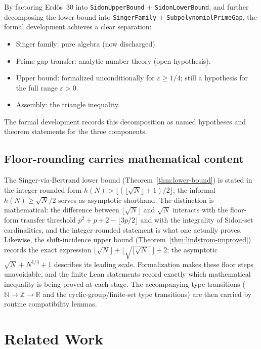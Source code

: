 \documentclass[11pt,a4paper]{article}
\begin{document}
By factoring Erd\H{o}s~30 into
\texttt{Sidon\-Upper\-Bound} $+$ \texttt{Sidon\-Lower\-Bound}, and further
decomposing the lower bound into \texttt{Singer\-Family} $+$
\texttt{Sub\-polynomial\-Prime\-Gap}, the formal development achieves a
clear separation:
\begin{itemize}[nosep]
  \item Singer family: pure algebra (now discharged).
  \item Prime gap transfer: analytic number theory (open hypothesis).
  \item Upper bound: formalized unconditionally for $\varepsilon\ge1/4$;
    still a hypothesis for the full range $\varepsilon>0$.
  \item Assembly: the triangle inequality.
\end{itemize}

The formal development records this decomposition as named hypotheses and
theorem statements for the three components.

\subsection{Floor-rounding carries mathematical content}

The Singer-via-Bertrand lower bound (Theorem~\ref{thm:lower-bound})
is stated in the integer-rounded form
$h(N) > \lfloor(\lfloor\sqrt{N}\rfloor+1)/2\rfloor$; the informal
$h(N) \ge \sqrt{N}/2$ serves as asymptotic shorthand.  The distinction is
mathematical: the difference between \(\lfloor\sqrt N\rfloor\) and \(\sqrt N\)
interacts with the floor-form transfer threshold
\(p^2+p+2-\lfloor 3p/2\rfloor\) and with the integrality of Sidon-set
cardinalities, and the integer-rounded statement is what one actually proves.
Likewise, the shift-incidence upper bound (Theorem~\ref{thm:lindstrom-improved})
records the exact expression
\(\lfloor\sqrt{N}\rfloor+\lfloor\sqrt{\lfloor\sqrt{N}\rfloor}\rfloor+2\);
the asymptotic \(\sqrt{N}+N^{1/4}+1\) describes its leading scale.
Formalization makes these floor steps unavoidable, and the finite Lean
statements record exactly which mathematical inequality is being proved at each
stage.  The accompanying type transitions
($\mathbb{N}\to\mathbb{Z}\to\mathbb{R}$ and the cyclic-group/finite-set
type transitions) are then carried by routine compatibility lemmas.

\section{Related Work}
\label{sec:related}
\end{document}
